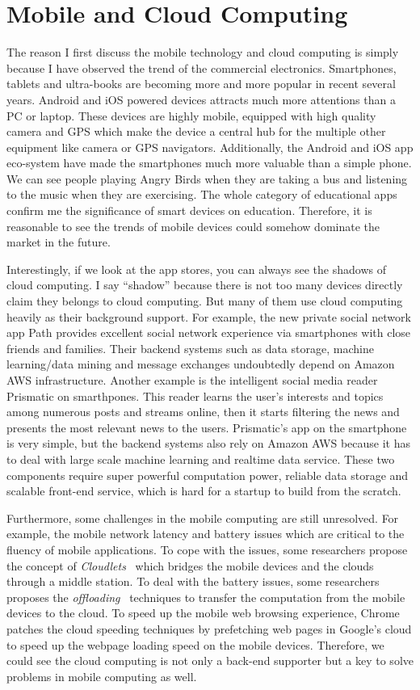 \section{Mobile and Cloud Computing}
The reason I first discuss the mobile technology and cloud computing is simply because I have observed the trend of the commercial electronics. Smartphones, tablets and ultra-books are becoming more and more popular in recent several years. Android and iOS powered devices attracts much more attentions than a PC or laptop. These devices are highly mobile, equipped with high quality camera and GPS which make the device a central hub for the multiple other equipment like camera or GPS navigators. Additionally, the Android and iOS app eco-system have made the smartphones much more valuable than a simple phone. We can see people playing Angry Birds when they are taking a bus and listening to the music when they are exercising. The whole category of educational apps confirm me the significance of smart devices on education. Therefore, it is reasonable to see the trends of mobile devices could somehow dominate the market in the future.

Interestingly, if we look at the app stores, you can always see the shadows of cloud computing. I say ``shadow'' because there is not too many devices directly claim they belongs to cloud computing. But many of them use cloud computing heavily as their background support. For example, the new private social network app Path\cite{path} provides excellent social network experience via smartphones with close friends and families. Their backend systems such as data storage, machine learning/data mining and message exchanges undoubtedly depend on Amazon AWS infrastructure. Another example is the intelligent social media reader Prismatic\cite{prismatic} on smarthpones. This reader learns the user's interests and topics among numerous posts and streams online, then it starts filtering the news and presents the most relevant news to the users. Prismatic's app on the smartphone is very simple, but the backend systems also rely on Amazon AWS because it has to deal with large scale machine learning and realtime data service. These two components require super powerful computation power, reliable data storage and scalable front-end service, which is hard for a startup to build from the scratch. 

Furthermore, some challenges in the mobile computing are still unresolved. For example, the mobile network latency and battery issues which are critical to the fluency of mobile applications. To cope with the issues, some researchers propose the concept of \emph{Cloudlets}~\cite{satyanarayanan2009case} which bridges the mobile devices and the clouds through a middle station. To deal with the battery issues, some researchers proposes the \emph{offloading}~\cite{kumar2010cloud} techniques to transfer the computation from the mobile devices to the cloud. To speed up the mobile web browsing experience, Chrome patches the cloud speeding techniques by prefetching web pages in Google's cloud to speed up the webpage loading speed on the mobile devices. Therefore, we could see the cloud computing is not only a back-end supporter but a key to solve problems in mobile computing as well.

